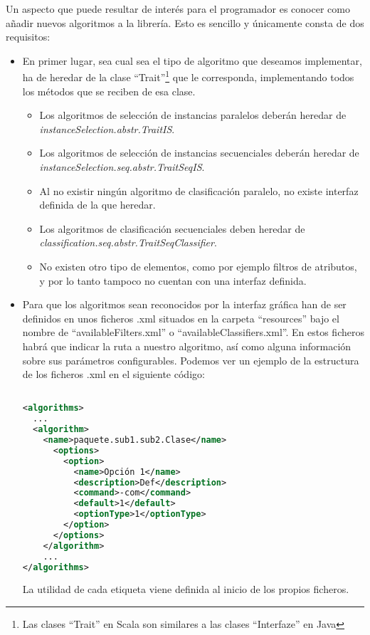 Un aspecto que puede resultar de interés para el programador es conocer como añadir nuevos algoritmos a la librería. Esto es sencillo y únicamente consta de dos requisitos:

\begin{itemize}
\item En primer lugar, sea cual sea el tipo de algoritmo que deseamos implementar, ha de heredar de la clase ``Trait''\footnote{Las clases ``Trait'' en Scala son similares a las clases ``Interfaze'' en Java} que le corresponda, implementando todos los métodos que se reciben de esa clase.
	\begin{itemize}
		\item Los algoritmos de selección de instancias paralelos deberán heredar de \textit{instanceSelection.abstr.TraitIS}.
		\item Los algoritmos de selección de instancias secuenciales deberán heredar de \textit{instanceSelection.seq.abstr.TraitSeqIS}.
		\item Al no existir ningún algoritmo de clasificación paralelo, no existe interfaz definida de la que heredar.
		\item Los algoritmos de clasificación secuenciales deben heredar de \textit{classification.seq.abstr.TraitSeqClassifier}.
		\item No existen otro tipo de elementos, como por ejemplo filtros de atributos, y por lo tanto tampoco no cuentan con una interfaz definida.
	\end{itemize} 
\item Para que los algoritmos sean reconocidos por la interfaz gráfica han de ser definidos en unos ficheros .xml situados en la carpeta ``resources'' bajo el nombre de ``availableFilters.xml'' o ``availableClassifiers.xml''. En estos ficheros habrá que indicar la ruta a nuestro algoritmo, así como alguna información sobre sus parámetros configurables. Podemos ver un ejemplo de la estructura de los ficheros .xml en el siguiente código:

\begin{lstlisting}[language=xml,keywordstyle=\color{black}]

<algorithms>
  ...
  <algorithm>
    <name>paquete.sub1.sub2.Clase</name>
	  <options>
		<option>
		  <name>Opción 1</name>
		  <description>Def</description>
		  <command>-com</command>
		  <default>1</default>
		  <optionType>1</optionType>
		</option>
	  </options>
	</algorithm>
	...
</algorithms>

\end{lstlisting}

La utilidad de cada etiqueta viene definida al inicio de los propios ficheros.

\end{itemize}


